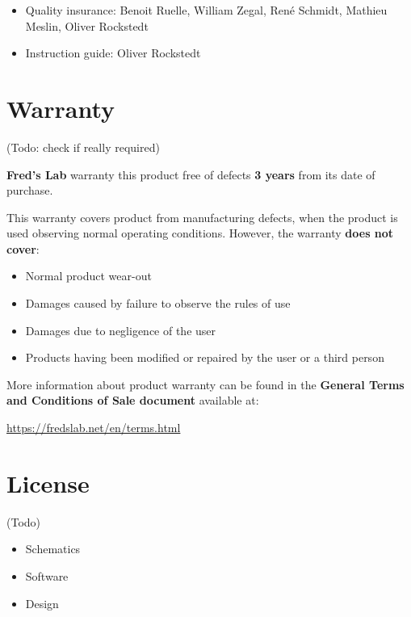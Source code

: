 \documentclass{scrartcl}
\begin{document}
\begin{itemize}
    \item Quality insurance: Benoit Ruelle, William Zegal, René Schmidt, Mathieu Meslin, Oliver Rockstedt
    \item Instruction guide: Oliver Rockstedt
\end{itemize}


\section{Warranty}

 (Todo: check if really required)

\textbf{Fred's Lab} warranty this product free of defects \textbf{3 years} from its
date of purchase.

This warranty covers product from manufacturing defects, when the product is used observing normal operating conditions. However, the warranty \textbf{does not cover}:

\begin{itemize}
    \item Normal product wear-out
    \item Damages caused by failure to observe the rules of use
    \item Damages due to negligence of the user
    \item Products having been modified or repaired by the user or a third person
\end{itemize}

More information about product warranty can be found in the \textbf{General Terms and Conditions of Sale document} available at:
\begin{center}
    \url{https://fredslab.net/en/terms.html}
\end{center}


\section{License}

 (Todo)

\begin{itemize}
    \item Schematics
    \item Software
    \item Design
\end{itemize}
\end{document}

